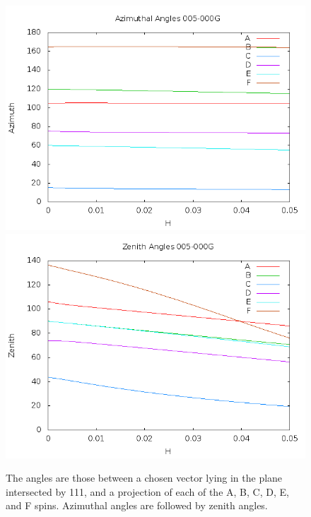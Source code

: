 \documentclass{article}
\begin{document}
\begin{figure}
\centering
\includegraphics[scale=0.5]{azim005to000G.png}
\includegraphics[scale=0.5]{zen005to000G.png}
\caption{The angles are those between a chosen vector lying in the plane intersected by 111,
and a projection of each of the A, B, C, D, E, and F  spins. Azimuthal angles are followed by zenith angles.}
\end{figure}
\pagebreak
\end{document}
